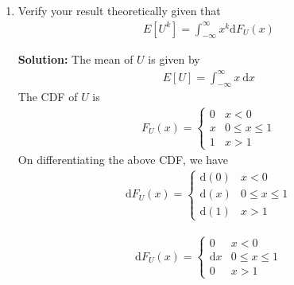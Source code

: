 \documentclass[journal,12pt,twocolumn]{IEEEtran}
\newcommand{\solution}{\noindent \textbf{Solution: }}
\providecommand{\mean}[1]{E\left[ #1 \right]}
\numberwithin{equation}{section}
\renewcommand\thesection{\arabic{section}}
\begin{document}
\begin{enumerate}[label=\thesection.\arabic*,ref=\thesection.\theenumi]
	\solution Download the following codes and execute the C program
	\begin{lstlisting}
wget https://github.com/Pradeep8802/Random_numbers/blob/main/1.4/mean_variance.c
wget https://github.com/Pradeep8802/Random_numbers/blob/main/1.1/coeffs.h
	\end{lstlisting}
Run the code by executing the below command
\begin{lstlisting}
cc mean_variance.c -lm
./a.out
\end{lstlisting}
	The output of the code is
	\begin{align}
		\mu &= 0.500007 \\
		\sigma^2 &= 0.083301 
	\end{align}
	
	\item Verify your result theoretically given that
	\begin{align}
		\mean{U^k} = \int_{-\infty}^{\infty}x^k \mathrm{d}F_{U}(x)
	\end{align}
		
	\solution The mean of $U$ is given by
        \begin{align}
		\mean{U} = \int_{-\infty}^{\infty}x ~\mathrm{d}x 
	\end{align}
        The CDF of $U$ is
        \begin{align}
		F_{U}(x) = 
		\begin{cases}
			0 & x < 0 \\
			x & 0 \le x \le 1 \\
			1 & x > 1
		\end{cases}
	\end{align}
 On differentiating the above CDF, we have
	\begin{align}
		\mathrm{d}F_{U}(x) = 
		\begin{cases}
			\mathrm{d}(0) & x < 0 \\
			\mathrm{d}(x) & 0 \le x \le 1 \\
			 \mathrm{d}(1) & x > 1
		\end{cases}
	\end{align}

 \begin{align}
		\mathrm{d}F_{U}(x) = 
		\begin{cases}
			0 & x < 0 \\
			\mathrm{d}x & 0 \le x \le 1 \\
			0 & x > 1
		\end{cases}
	\end{align}


\end{enumerate}
\end{document}

